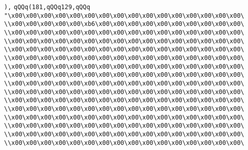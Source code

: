 \verb|),|\newline
\verb|qQQq(181,qQQq129,qQQq|\newline
\verb|"\x00\x00\x00\x00\x00\x00\x00\x00\x00\x00\x00\x00\x00\x00\x00\x00\|\newline
\verb|\\x00\x00\x00\x00\x00\xb6\x00\x00\x00\x00\x00\x00\x00\x00\x00\x00\|\newline
\verb|\\x00\x00\x00\x00\x00\x00\x00\x00\x00\x00\x00\x00\x00\x00\x00\x00\|\newline
\verb|\\x00\x00\x00\x00\x00\x00\x00\x00\x00\x00\x00\x00\x00\x00\x00\x00\|\newline
\verb|\\x00\x00\x00\x00\x00\x00\x00\x00\x00\x00\x00\x00\x00\x00\x00\x00\|\newline
\verb|\\x00\x00\x00\x00\x00\x00\x00\x00\x00\x00\x00\x00\x00\x00\x00\x00\|\newline
\verb|\\x00\x00\x00\x00\x00\x00\x00\x00\x00\x00\x00\x00\x00\x00\x00\x00\|\newline
\verb|\\x00\x00\x00\x00\x00\x00\x00\x00\x00\x00\x00\x00\x00\x00\x00\x00\|\newline
\verb|\\x00\x00\x00\x00\x00\x00\x00\x00\x00\x00\x00\x00\x00\x00\x00\x00\|\newline
\verb|\\x00\x00\x00\x00\x00\x00\x00\x00\x00\x00\x00\x00\x00\x00\x00\x00\|\newline
\verb|\\x00\x00\x00\x00\x00\x00\x00\x00\x00\x00\x00\x00\x00\x00\x00\x00\|\newline
\verb|\\x00\x00\x00\x00\x00\x00\x00\x00\x00\x00\x00\x00\x00\x00\x00\x00\|\newline
\verb|\\x00\x00\x00\x00\x00\x00\x00\x00\x00\x00\x00\x00\x00\x00\x00\x00\|\newline
\verb|\\x00\x00\x00\x00\x00\x00\x00\x00\x00\x00\x00\x00\x00\x00\x00\x00\|\newline
\verb|\\x00\x00\x00\x00\x00\x00\x00\x00\x00\x00\x00\x00\x00\x00\x00\x00\|\newline
\verb|\\x00\x00\x00\x00\x00\x00\x00\x00\x00\x00\x00\x00\x00\x00\x00\x00\|\newline

